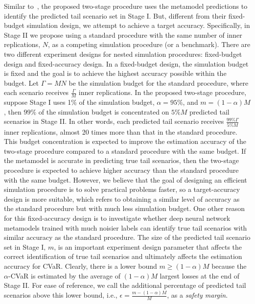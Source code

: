 \documentclass[]{article}
\begin{document}
Similar to~\cite{dang2020efficient}, the proposed two-stage procedure uses the metamodel predictions to identify the predicted tail scenario set in Stage I.
But, different from their fixed-budget simulation design, we attempt to achieve a target accuracy.
Specifically, in Stage II we propose using a standard procedure with the same number of inner replications, $N$, as a competing simulation procedure (or a benchmark).
There are two different experiment designs for nested simulation procedures: fixed-budget design and fixed-accuracy design.
In a fixed-budget design, the simulation budget is fixed and the goal is to achieve the highest accuracy possible within the budget.
Let $\Gamma = MN$ be the simulation budget for the standard procedure, where each scenario receives $\frac{\Gamma}{M}$ inner replications.
In the proposed two-stage procedure, suppose Stage I uses 1\% of the simulation budget, $\alpha = 95\%$, and $m=(1-\alpha)M$, then $99\%$ of the simulation budget is concentrated on $5\% M$ predicted tail scenarios in Stage II.
In other words, each predicted tail scenario receives $\frac{99\% \Gamma}{5\% M}$ inner replications, almost 20 times more than that in the standard procedure.
This budget concentration is expected to improve the estimation accuracy of the two-stage procedure compared to a standard procedure with the same budget. 
If the metamodel is accurate in predicting true tail scenarios, then the two-stage procedure is expected to achieve higher accuracy than the standard procedure with the same budget.
However, we believe that the goal of designing an efficient simulation procedure is to solve practical problems faster, so a target-accuracy design is more suitable, which refers to obtaining a similar level of accuracy as the standard procedure but with much less simulation budget.
One other reason for this fixed-accuracy design is to investigate whether deep neural network metamodels trained with much noisier labels can identify true tail scenarios with similar accuracy as the standard procedure.
The size of the predicted tail scenario set in Stage I, $m$, is an important experiment design parameter that affects the correct identification of true tail scenarios and ultimately affects the estimation accuracy for CVaR.
Clearly, there is a lower bound $m \geq (1-\alpha)M$ because the $\alpha$-CVaR is estimated by the average of $(1-\alpha)M$ largest losses at the end of Stage II.
For ease of reference, we call the additional percentage of predicted tail scenarios above this lower bound, i.e., $\epsilon = \frac{m - (1-\alpha)M}{M}$, as a \textit{safety margin}.
\end{document}
